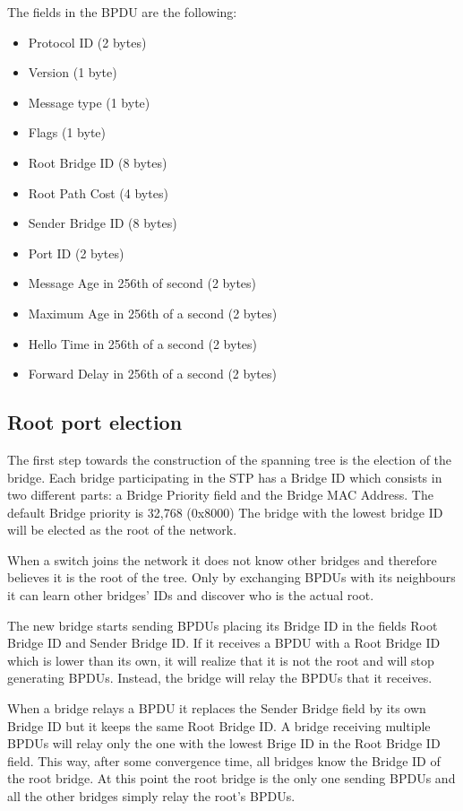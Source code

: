 The fields in the BPDU are the following:
\begin{itemize}
\item Protocol ID (2 bytes)
\item Version (1 byte)
\item Message type (1 byte)
\item Flags (1 byte)
\item Root Bridge ID (8 bytes)
\item Root Path Cost (4 bytes)
\item Sender Bridge ID (8 bytes)
\item Port ID (2 bytes)
\item Message Age in 256th of second (2 bytes)
\item Maximum Age in 256th of a second (2 bytes)
\item Hello Time in 256th of a second (2 bytes)
\item Forward Delay in 256th of a second (2 bytes)
\end{itemize}

\subsection{Root port election}

The first step towards the construction of the spanning tree is the election of the bridge.
Each bridge participating in the STP has a Bridge ID which consists in two different parts: a Bridge Priority field and the Bridge MAC Address.
The default Bridge priority is 32,768 (0x8000)
The bridge with the lowest bridge ID will be elected as the root of the network.

When a switch joins the network it does not know other bridges and therefore believes it is the root of the tree.
Only by exchanging BPDUs with its neighbours it can learn other bridges' IDs and discover who is the actual root.

The new bridge starts sending BPDUs placing its Bridge ID in the fields Root Bridge ID and Sender Bridge ID.
If it receives a BPDU with a Root Bridge ID which is lower than its own, it will realize that it is not the root and will stop generating BPDUs.
Instead, the bridge will relay the BPDUs that it receives.

When a bridge relays a BPDU it replaces the Sender Bridge field by its own Bridge ID but it keeps the same Root Bridge ID.
A bridge receiving multiple BPDUs will relay only the one with the lowest Brige ID in the Root Bridge ID field.
This way, after some convergence time, all bridges know the Bridge ID of the root bridge.
At this point the root bridge is the only one sending BPDUs and all the other bridges simply relay the root's BPDUs.


